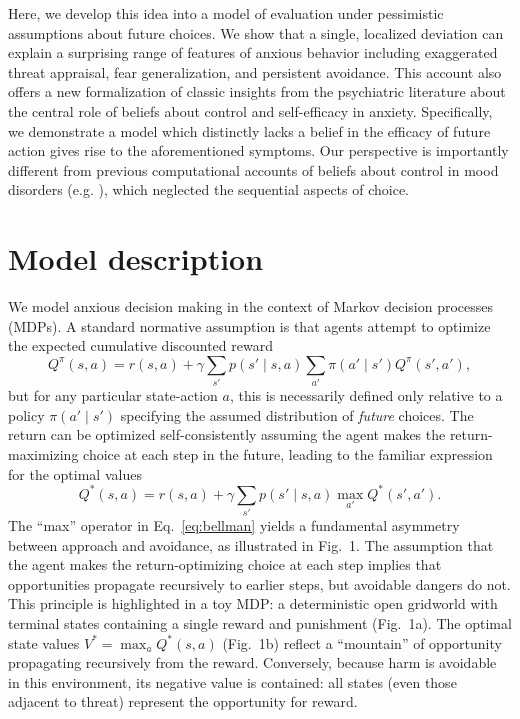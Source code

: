 \documentclass[11pt]{article} %
\begin{document}
Here, we develop this idea into a model of evaluation under pessimistic assumptions about future choices. We show that a single, localized deviation can explain a surprising range of features of anxious behavior including exaggerated threat appraisal, fear generalization, and persistent avoidance. This account also offers a new formalization of classic insights from the psychiatric literature about the central role of beliefs about control and self-efficacy in anxiety. Specifically, we demonstrate a model which distinctly lacks a belief in the efficacy of future action gives rise to the aforementioned symptoms. Our perspective is importantly different from previous computational accounts of beliefs about control in mood disorders (e.g. \cite{HuysDayan2009}), which neglected the sequential aspects of choice.


\section{Model description}

We model anxious decision making in the context of Markov decision processes (MDPs). A standard normative assumption is that agents attempt to optimize the expected cumulative discounted reward
\begin{equation*}
Q^\pi(s,a) = r(s,a) + \gamma \sum_{s'} p(s' \mid s,a) \sum_{a'} \pi(a' \mid s') Q^\pi(s',a'),
\end{equation*}
but for any particular state-action $a$, this is necessarily defined only relative to a policy $\pi(a' \mid s')$ specifying the assumed distribution of \emph{future} choices. The return can be optimized self-consistently assuming the agent makes the return-maximizing choice at each step in the future, leading to the familiar expression for the optimal values
\begin{equation}\label{eq:bellman}
 Q^*(s,a) = r(s,a) + \gamma \sum_{s'} p(s' \mid s,a) \max_{a'} Q^*(s',a').
\end{equation}
The ``max'' operator in Eq.~\ref{eq:bellman} yields a fundamental asymmetry between approach and avoidance, as illustrated in Fig.~1. The assumption that the agent makes the return-optimizing choice at each step implies that opportunities propagate recursively to earlier steps, but avoidable dangers do not. This principle is highlighted in a toy MDP: a deterministic open gridworld with terminal states containing a single reward and punishment (Fig.~1a). The optimal state values $V^* = \max_a Q^*(s,a)$ (Fig.~1b) reflect a ``mountain'' of opportunity propagating recursively from the reward. Conversely, because harm is avoidable in this environment, its negative value is contained: all states (even those adjacent to threat) represent the opportunity for reward.
\end{document}
